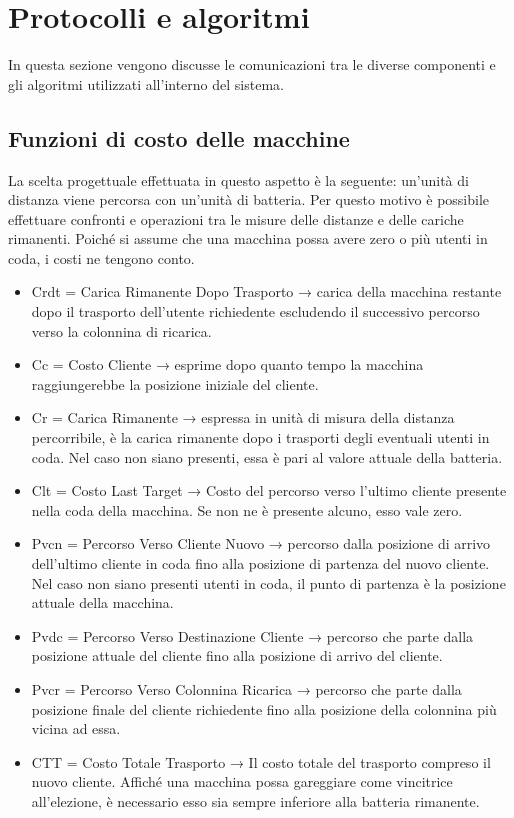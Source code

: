 \section{Protocolli e algoritmi}
In questa sezione vengono discusse le comunicazioni tra le diverse componenti e gli algoritmi utilizzati all'interno del sistema.

\subsection{Funzioni di costo delle macchine} \label{funzioni_di_costo_macchine}
La scelta progettuale effettuata in questo aspetto è la seguente: un'unità di distanza viene percorsa con un'unità di batteria. Per questo motivo è possibile effettuare confronti e operazioni tra le misure delle distanze e delle cariche rimanenti. 
Poiché si assume che una macchina possa avere zero o più utenti in coda, i costi ne tengono conto.

\begin{itemize}
	\item Crdt = Carica Rimanente Dopo Trasporto → carica della macchina restante dopo il trasporto dell'utente richiedente escludendo il successivo percorso verso la colonnina di ricarica.
	
	\item Cc = Costo Cliente → esprime dopo quanto tempo la macchina raggiungerebbe la posizione iniziale del cliente.
	
	\item Cr = Carica Rimanente → espressa in unità di misura della distanza percorribile, è la carica rimanente dopo i trasporti degli eventuali utenti in coda. Nel caso non siano presenti, essa è pari al valore attuale della batteria.
	
	\item Clt = Costo Last Target → Costo del percorso verso l'ultimo cliente presente nella coda della macchina. Se non ne è presente alcuno, esso vale zero.
	
	\item Pvcn = Percorso Verso Cliente Nuovo → percorso dalla posizione di arrivo dell'ultimo cliente in coda fino alla posizione di partenza del nuovo cliente. Nel caso non siano presenti utenti in coda, il punto di partenza è la posizione attuale della macchina.
	
	\item Pvdc = Percorso Verso Destinazione Cliente → percorso che parte dalla posizione attuale del cliente fino alla posizione di arrivo del cliente. 
	
	\item Pvcr = Percorso Verso Colonnina Ricarica → percorso che parte dalla posizione finale del cliente richiedente fino alla posizione della colonnina più vicina ad essa. 
	
	\item CTT = Costo Totale Trasporto → Il costo totale del trasporto compreso il nuovo cliente. Affiché una macchina possa gareggiare come vincitrice all'elezione, è necessario esso sia sempre inferiore alla batteria rimanente.
\end{itemize}

